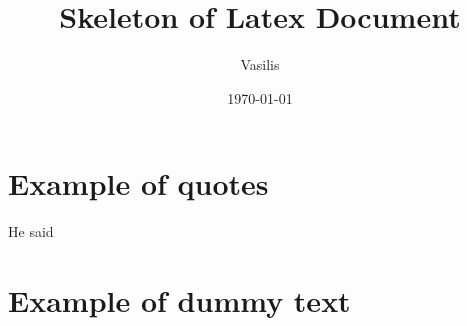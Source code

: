 \documentclass{article}
\title{Skeleton of Latex Document}
\author{Vasilis}
\date{\today}
\begin{document}
\maketitle

\section{Example of quotes}
He said 

\section{Example of dummy text}
\blindtext
\end{document}
